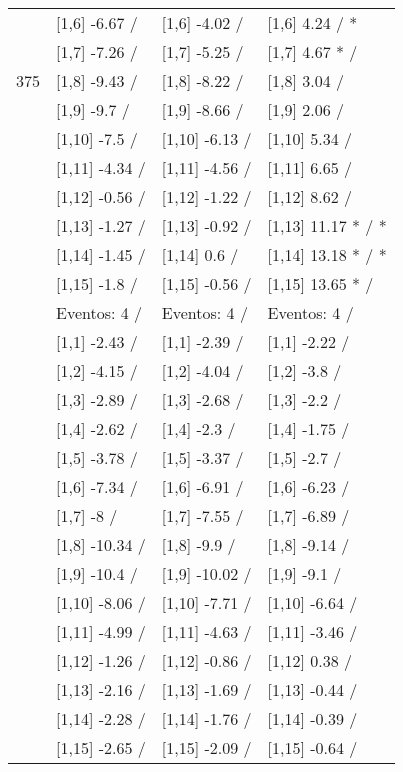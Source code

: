 \begin{table}
\begin{tabular}[t]{llll}
 & {}[1,6] -6.67  / & {}[1,6] -4.02  / & {}[1,6] 4.24  / *\\
 & {}[1,7] -7.26  / & {}[1,7] -5.25  / & {}[1,7] 4.67 * /\\
375 & {}[1,8] -9.43  / & {}[1,8] -8.22  / & {}[1,8] 3.04  /\\
\addlinespace
 & {}[1,9] -9.7  / & {}[1,9] -8.66  / & {}[1,9] 2.06  /\\
 & {}[1,10] -7.5  / & {}[1,10] -6.13  / & {}[1,10] 5.34  /\\
 & {}[1,11] -4.34  / & {}[1,11] -4.56  / & {}[1,11] 6.65  /\\
 & {}[1,12] -0.56  / & {}[1,12] -1.22  / & {}[1,12] 8.62  /\\
 & {}[1,13] -1.27  / & {}[1,13] -0.92  / & {}[1,13] 11.17 * / *\\
\addlinespace
 & {}[1,14] -1.45  / & {}[1,14] 0.6  / & {}[1,14] 13.18 * / *\\
 & {}[1,15] -1.8  / & {}[1,15] -0.56  / & {}[1,15] 13.65 * /\\
 & Eventos:  4 / & Eventos:  4 / & Eventos:  4 /\\
 & {}[1,1] -2.43  / & {}[1,1] -2.39  / & {}[1,1] -2.22  /\\
 & {}[1,2] -4.15  / & {}[1,2] -4.04  / & {}[1,2] -3.8  /\\
\addlinespace
 & {}[1,3] -2.89  / & {}[1,3] -2.68  / & {}[1,3] -2.2  /\\
 & {}[1,4] -2.62  / & {}[1,4] -2.3  / & {}[1,4] -1.75  /\\
 & {}[1,5] -3.78  / & {}[1,5] -3.37  / & {}[1,5] -2.7  /\\
 & {}[1,6] -7.34  / & {}[1,6] -6.91  / & {}[1,6] -6.23  /\\
 & {}[1,7] -8  / & {}[1,7] -7.55  / & {}[1,7] -6.89  /\\
\addlinespace
500 & {}[1,8] -10.34  / & {}[1,8] -9.9  / & {}[1,8] -9.14  /\\
 & {}[1,9] -10.4  / & {}[1,9] -10.02  / & {}[1,9] -9.1  /\\
 & {}[1,10] -8.06  / & {}[1,10] -7.71  / & {}[1,10] -6.64  /\\
 & {}[1,11] -4.99  / & {}[1,11] -4.63  / & {}[1,11] -3.46  /\\
 & {}[1,12] -1.26  / & {}[1,12] -0.86  / & {}[1,12] 0.38  /\\
\addlinespace
 & {}[1,13] -2.16  / & {}[1,13] -1.69  / & {}[1,13] -0.44  /\\
 & {}[1,14] -2.28  / & {}[1,14] -1.76  / & {}[1,14] -0.39  /\\
 & {}[1,15] -2.65  / & {}[1,15] -2.09  / & {}[1,15] -0.64  /\\
\bottomrule
\end{tabular}
\end{table}
